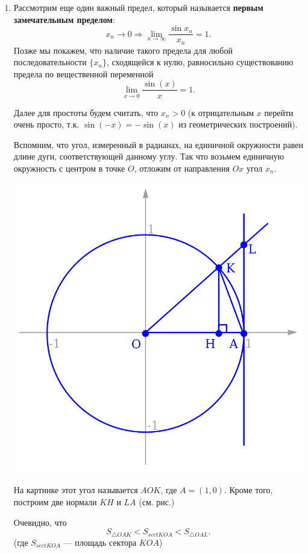 \begin{enumerate}


\item Рассмотрим еще один важный предел, который называется \textbf{первым замечательным пределом}:
$$
x_n\to 0\Rightarrow \lim_{n\to\infty}\frac{\sin x_n}{x_n}=1.
$$
Позже мы покажем, что наличие такого предела для любой последовательности $\{x_n\}$, сходящейся к нулю, равносильно существованию предела по вещественной переменной
$$
\lim_{x\to 0}\frac{\sin(x)}{x}=1.
$$

Далее для простоты будем считать, что $x_n>0$ (к отрицательным $x$ перейти очень просто, т.к. $\sin(-x)=-\sin(x)$ из геометрических построений).

Вспомним, что угол, измеренный в радианах, на единичной окружности равен длине дуги, соответствующей данному углу. Так что возьмем единичную окружность с центром в точке $O$, отложим от направления $Ox$ угол $x_n$.
\begin{center}
\includegraphics[scale=0.3]{sinx.png}
\end{center}
На картинке этот угол называется $AOK$, где $A=(1,0)$. Кроме того, построим две нормали $KH$ и $LA$ (см. рис.)

Очевидно, что
\begin{equation}\label{SSS}
S_{\triangle OAK} < S_{sect KOA} < S_{\triangle OAL}.
\end{equation}
(где $S_{sect KOA}$ --- площадь сектора $KOA$)


\end{enumerate}
